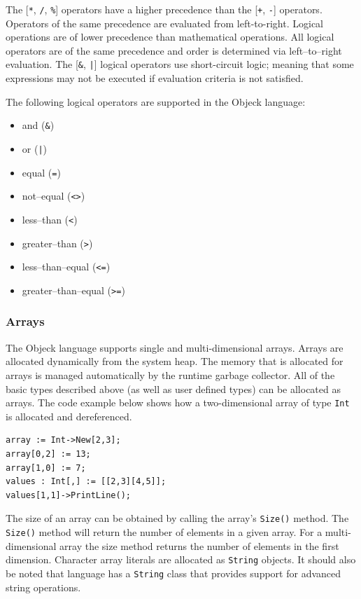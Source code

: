 \documentclass[12pt]{article}
\begin{document}
The [\texttt{*}, \texttt{/}, \texttt{\%}] operators have a higher precedence than  the [\texttt{+}, \texttt{-}] operators. Operators of the same precedence are evaluated from left-to-right.  Logical operations are of lower precedence than mathematical operations. All logical operators are of the same precedence and order is determined via left--to--right evaluation.  The [\texttt{\&}, \texttt{|}] logical operators use short-circuit logic; meaning that some expressions may not be executed if evaluation criteria is not satisfied.

The following logical operators are supported in the Objeck language:
\begin{itemize}
    \item and (\texttt{\&})
    \item or (\texttt{|})
    \item equal (\texttt{=})
    \item not--equal (\texttt{<>})
    \item less--than (\texttt{<})
    \item greater--than (\texttt{>})
    \item less--than--equal (\texttt{<=})
    \item greater--than--equal (\texttt{>=})
\end{itemize}

\subsubsection{Arrays}
The Objeck language supports single and multi-dimensional arrays.  Arrays are allocated dynamically from the system heap.  The memory that is allocated for arrays is managed automatically by the runtime garbage collector.  All of the basic types described above (as well as user defined types) can be allocated as arrays.  The code example below shows how a two-dimensional array of type \texttt{Int} is allocated and dereferenced.


\begin{verbatim}
array := Int->New[2,3];
array[0,2] := 13;
array[1,0] := 7;
values : Int[,] := [[2,3][4,5]];
values[1,1]->PrintLine();
\end{verbatim}

The size of an array can be obtained by calling the array's \texttt{Size()} method.  The \texttt{Size()} method will return the number of elements in a given array.  For a multi-dimensional array the size method returns the number of elements in the first dimension.  Character array literals are allocated as \texttt{String} objects.  It should also be noted that language has a \texttt{String} class that provides support for advanced string operations.
\end{document}
